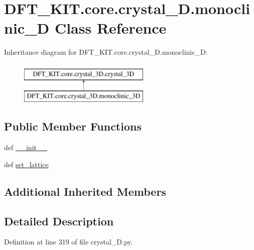 \hypertarget{class_d_f_t___k_i_t_1_1core_1_1crystal__3_d_1_1monoclinic__3_d}{\section{D\+F\+T\+\_\+\+K\+I\+T.\+core.\+crystal\+\_\+D.\+monoclinic\+\_\+D Class Reference}
\label{class_d_f_t___k_i_t_1_1core_1_1crystal__3_d_1_1monoclinic__3_d}
}
Inheritance diagram for D\+F\+T\+\_\+\+K\+I\+T.\+core.\+crystal\+\_\+D.\+monoclinic\+\_\+D\+:\begin{figure}[H]
\begin{center}
\leavevmode
\includegraphics[height=2.000000cm]{class_d_f_t___k_i_t_1_1core_1_1crystal__3_d_1_1monoclinic__3_d}
\end{center}
\end{figure}
\subsection*{Public Member Functions}
\begin{DoxyCompactItemize}
\item 
def \hyperlink{class_d_f_t___k_i_t_1_1core_1_1crystal__3_d_1_1monoclinic__3_d_a44b4a6b8eb9ababeee422b1c2f7d16a3}{\+\_\+\+\_\+init\+\_\+\+\_\+}
\item 
def \hyperlink{class_d_f_t___k_i_t_1_1core_1_1crystal__3_d_1_1monoclinic__3_d_a718de9988bedf7b2b20de7362591e5c9}{set\+\_\+lattice}
\end{DoxyCompactItemize}
\subsection*{Additional Inherited Members}


\subsection{Detailed Description}


Definition at line 319 of file crystal\+\_\+D.\+py.



